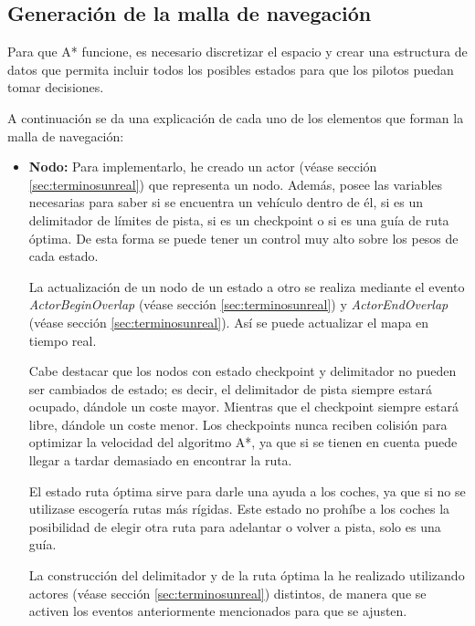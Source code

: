 \subsection{Generación de la malla de navegación}
Para que A* funcione, es necesario discretizar el espacio y crear una estructura de datos que permita incluir todos los posibles estados para que los pilotos puedan tomar decisiones.

\bigskip

A continuación se da una explicación de cada uno de los elementos que forman la malla de navegación:

\begin{itemize}
    \item \textbf{Nodo: }Para implementarlo, he creado un actor (véase sección \ref{sec:terminosunreal}) que representa un nodo. Además, posee las variables necesarias para saber si se encuentra un vehículo dentro de él, si es un delimitador de límites de pista, si es un checkpoint o si es una guía de ruta óptima. De esta forma se puede tener un control muy alto sobre los pesos de cada estado.
    
    \bigskip
    
    La actualización de un nodo de un estado a otro se realiza mediante el evento \textit{ActorBeginOverlap} (véase sección \ref{sec:terminosunreal}) y \textit{ActorEndOverlap} (véase sección \ref{sec:terminosunreal}). Así se puede actualizar el mapa en tiempo real.
    
    \bigskip
    
    Cabe destacar que los nodos con estado checkpoint y delimitador no pueden ser cambiados de estado; es decir, el delimitador de pista siempre estará ocupado, dándole un coste mayor. Mientras que el checkpoint siempre estará libre, dándole un coste menor. Los checkpoints nunca reciben colisión para optimizar la velocidad del algoritmo A*, ya que si se tienen en cuenta puede llegar a tardar demasiado en encontrar la ruta.
    
    \bigskip
    
    El estado ruta óptima sirve para darle una ayuda a los coches, ya que si no se utilizase escogería rutas más rígidas. Este estado no prohíbe a los coches la posibilidad de elegir otra ruta para adelantar o volver a pista, solo es una guía.
    
    \bigskip
    
    La construcción del delimitador y de la ruta óptima la he realizado utilizando actores (véase sección \ref{sec:terminosunreal}) distintos, de manera que se activen los eventos anteriormente mencionados para que se ajusten.
    

\end{itemize}
